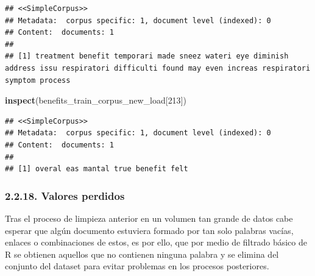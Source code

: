 \documentclass[spanish,]{article}
\newenvironment{Shaded}{\begin{snugshade}}{\end{snugshade}}
\newcommand{\KeywordTok}[1]{\textcolor[rgb]{0.13,0.29,0.53}{\textbf{#1}}}
\newcommand{\DecValTok}[1]{\textcolor[rgb]{0.00,0.00,0.81}{#1}}
\newcommand{\NormalTok}[1]{#1}
\begin{document}
\begin{verbatim}
## <<SimpleCorpus>>
## Metadata:  corpus specific: 1, document level (indexed): 0
## Content:  documents: 1
## 
## [1] treatment benefit temporari made sneez wateri eye diminish address issu respiratori difficulti found may even increas respiratori symptom process
\end{verbatim}

\begin{Shaded}
\begin{Highlighting}[]
\KeywordTok{inspect}\NormalTok{(benefits_train_corpus_new_load[}\DecValTok{213}\NormalTok{])}
\end{Highlighting}
\end{Shaded}

\begin{verbatim}
## <<SimpleCorpus>>
## Metadata:  corpus specific: 1, document level (indexed): 0
## Content:  documents: 1
## 
## [1] overal eas mantal true benefit felt
\end{verbatim}

\subsubsection{2.2.18. Valores perdidos}\label{valores-perdidos}

Tras el proceso de limpieza anterior en un volumen tan grande de datos
cabe esperar que algún documento estuviera formado por tan solo palabras
vacías, enlaces o combinaciones de estos, es por ello, que por medio de
filtrado básico de R se obtienen aquellos que no contienen ninguna
palabra y se elimina del conjunto del dataset para evitar problemas en
los procesos posteriores.
\end{document}
